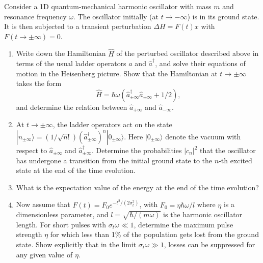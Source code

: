 \begin{exercise}
\label{physics:2024:2}
Consider a 1D quantum-mechanical harmonic oscillator with mass $m$ and resonance frequency $\omega$. The oscillator initially (at $t \to -\infty$) is in its ground state. It is then subjected to a transient perturbation $\Delta H = F(t)x$ with $F(t \to \pm \infty) = 0$.

\begin{enumerate}[label=(\alph*)]
    \item Write down the Hamiltonian $\hat{H}$ of the perturbed oscillator described above in terms of the usual ladder operators $\hat{a}$ and $\hat{a}^\dagger$, and solve their equations of motion in the Heisenberg picture. Show that the Hamiltonian at $t \to \pm \infty$ takes the form
    \begin{equation}
        \hat{H} = \hbar \omega \left(\hat{a}_{\pm \infty}^\dagger \hat{a}_{\pm \infty} + 1/2\right), \label{eq:2024:2:2}
    \end{equation}
    and determine the relation between $\hat{a}_{+\infty}$ and $\hat{a}_{-\infty}$.
    \item At $t \to \pm \infty$, the ladder operators act on the state $|n_{\pm \infty}\rangle = (1/\sqrt{n!})(\hat{a}_{\pm \infty}^\dagger)^n |0_{\pm \infty}\rangle$. Here $|0_{\pm \infty}\rangle$ denote the vacuum with respect to $\hat{a}_{\pm \infty}$ and $\hat{a}_{\pm \infty}^\dagger$. Determine the probabilities $|c_n|^2$ that the oscillator has undergone a transition from the initial ground state to the $n$-th excited state at the end of the time evolution.
    \item What is the expectation value of the energy at the end of the time evolution?
    \item Now assume that $F(t) = F_0 e^{-t^2 / (2\sigma_t^2)}$, with $F_0 = \eta \hbar \omega / l$ where $\eta$ is a dimensionless parameter, and $l = \sqrt{\hbar / (m \omega)}$ is the harmonic oscillator length. For short pulses with $\sigma_t \omega \ll 1$, determine the maximum pulse strength $\eta$ for which less than 1\% of the population gets lost from the ground state. Show explicitly that in the limit $\sigma_t \omega \gg 1$, losses can be suppressed for any given value of $\eta$.
\end{enumerate}
\end{exercise}

